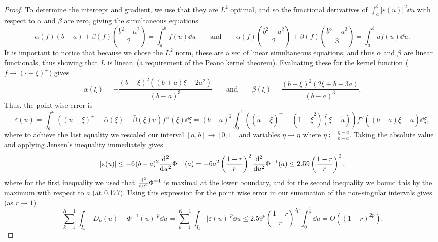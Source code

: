 \documentclass[manuscript,review]{acmart}
\begin{document}
\begin{proof}
To determine the intercept and gradient, we use that they are $ L^2 $ optimal, and so the functional derivatives of $ \int_a^b \lvert \varepsilon(u) \rvert^2 \dd{u} $ with respect to $ \alpha $ and $ \beta $ are zero, giving the simultaneous equations
\begin{equation*}
\alpha(f)(b-a) + \beta(f) \left(\dfrac{b^2 - a^2}{2}\right)  = \int_{a}^{b} f(u) \dd{u} 
\qquad \text{and} \qquad 
\alpha(f)\left(\dfrac{b^2 - a^2}{2}\right) + \beta(f) \left(\dfrac{b^3 - a^3}{3}\right)  = \int_{a}^{b} u f(u) \dd{u}.
\end{equation*}
It is important to notice that because we chose the $ L^2 $ norm, these are a set of linear simultaneous equations, and thus $ \alpha $ and $ \beta $ are linear functionals, thus showing that $ L $ is linear, (a requirement of the Peano kernel theorem). Evaluating these for the kernel function ($ f \to (\cdot - \xi)^+  $) gives
\begin{equation*}
\bar{\alpha}(\xi)  = - \dfrac{(b - \xi)^2 ((b+a)\xi - 2a^2)}{(b - a)^3} 
\qquad \text{and} \qquad 
\label{eqt:peano_kernel_coefficient}
\bar{\beta}(\xi) = \dfrac{(b - \xi)^2 (2\xi + b - 3a)}{(b - a)^3}.
\end{equation*}
Thus, the point wise error is 
\begin{equation*}
\varepsilon(u)  = \int_{a}^{b} ((u - \xi)^+ - \bar{\alpha}(\xi) - \bar{\beta}(\xi) u ) f''(\xi) \dd{\xi} = (b - a)^2 \int_{0}^{1} ((\tilde{u} - \tilde{\xi})^+ - (1 - \tilde{\xi}^2)(\tilde{\xi} + \tilde{u})) f''((b - a)\tilde{\xi} + a) \dd{\tilde{\xi}},
\end{equation*}
where to achieve the last equality we rescaled our interval $ [a, b] \to [0, 1] $  and variables $ \eta \to \tilde{\eta}  $ where $ \tilde{\eta} \coloneqq \tfrac{\eta - a}{b - a} $. Taking the absolute value and applying Jensen's inequality immediately gives 
\begin{equation*}
\lvert \varepsilon(u) \rvert \leq - 6 (b - a)^2  {\dv[2]{}{u}}\Phi^{-1}(a) = - 6 a^2 \left(\dfrac{1-r}{r}\right)^2  {\dv[2]{}{u}}\Phi^{-1}(a) \leq 2.59 \left(\dfrac{1-r}{r}\right)^2,
\end{equation*}
where for the first inequality we used that $ {\dv[2]{}{u}}\Phi^{-1} $ is maximal at the lower boundary, and for the second inequality we bound this by the maximum with respect to $ a $ (at 0.177). Using this expression for the point wise error in our summation of the non-singular intervals gives (as $ r \to 1 $)
\begin{equation*}
 \sum_{k=1}^{K-1} \int_{I_k} \lvert D_k(u) - \Phi^{-1}(u)\rvert^p \dd{u}
= \sum_{k = 1}^{K - 1} \int_{I_k} \lvert\varepsilon(u)\rvert^p \dd{u}
\leq 2.59^p \left(\dfrac{1 - r}{r}\right)^{2p}  \int_{0}^{\frac{1}{2}} \dd{u}
= O((1-r)^{2p}).
\end{equation*}


\end{proof}
\end{document}
